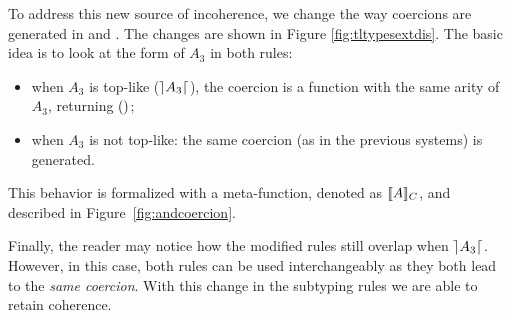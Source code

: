 To address this new source of incoherence, we change the way coercions
are generated in  and
. The changes are shown in Figure \ref{fig:tltypesextdis}.
The basic idea is to look at the form of $A_3$ in both rules:
\begin{itemize}
\item when $A_3$ is top-like ($\rceil A_3 \lceil$), the coercion is a function with the same arity of $A_3$, returning $()$;  
\item when $A_3$ is not top-like: the same coercion (as in the previous
  systems) is generated.
\end{itemize}
This behavior is formalized with a meta-function, denoted as $\llbracket A \rrbracket_{C}$, and described in
Figure~\ref{fig:andcoercion}.

Finally, the reader may notice how the modified rules still overlap when $\rceil A_3 \lceil$. 
However, in this case, both rules can be used interchangeably as they both lead to the \emph{same coercion}.
With this change in the subtyping rules we are able to retain coherence.

